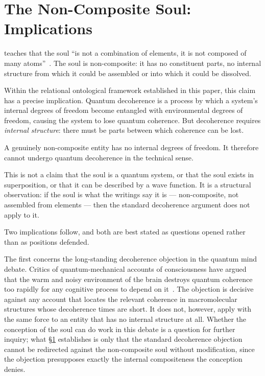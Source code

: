 
\section{The Non-Composite Soul: Implications}
\label{sec:soul}


\AbdulBaha teaches that the soul ``is not a combination of elements,
it is not composed of many atoms''~\citep{SAQ}.
The soul is non-composite: it has no constituent parts, no internal structure
from which it could be assembled or into which it could be dissolved.

Within the relational ontological framework established in this paper,
this claim has a precise implication.
Quantum decoherence is a process by which a system's internal degrees of freedom
become entangled with environmental degrees of freedom, causing the system to
lose quantum coherence.
But decoherence requires \emph{internal structure}: there must be parts
between which coherence can be lost.

A genuinely non-composite entity has no internal degrees of freedom.
It therefore cannot undergo quantum decoherence in the technical sense.

This is not a claim that the soul is a quantum system, or that the soul exists
in superposition, or that it can be described by a wave function.
It is a structural observation: if the soul is what the \bahai writings say it is
--- non-composite, not assembled from elements --- then the standard decoherence
argument does not apply to it.

Two implications follow, and both are best stated as questions opened rather
than as positions defended.

The first concerns the long-standing decoherence objection in the quantum
mind debate.
Critics of quantum-mechanical accounts of consciousness have argued that the
warm and noisy environment of the brain destroys quantum coherence too rapidly
for any cognitive process to depend on it~\citep{Zurek2003}.
The objection is decisive against any account that locates the relevant
coherence in macromolecular structures whose decoherence times are short.
It does not, however, apply with the same force to an entity that has no
internal structure at all.
Whether the \bahai conception of the soul can do work in this debate is a
question for further inquiry; what \S\ref{sec:soul} establishes is only that
the standard decoherence objection cannot be redirected against the
non-composite soul without modification, since the objection presupposes
exactly the internal compositeness the \bahai conception denies.

